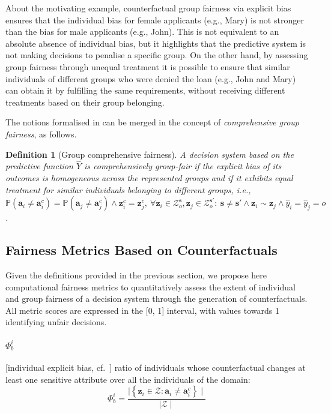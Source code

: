 \documentclass[letterpaper]{article} %
\newtheorem{definition}{Definition}
\begin{document}
About the motivating example, counterfactual group fairness via explicit bias ensures that the individual bias for female applicants (e.g., Mary) is not stronger than the bias for male applicants (e.g., John). This is not equivalent to an absolute absence of individual bias, but it highlights that the predictive system is not making decisions to penalise a specific group.
%
On the other hand, by assessing group fairness through unequal treatment it is possible to ensure that similar individuals of different groups who were denied the loan (e.g., John and Mary) can obtain it by fulfilling the same requirements, without receiving different treatments based on their group belonging.

The notions formalised in  can be merged in the concept of \emph{comprehensive group fairness}, as follows.
%
\begin{definition}[Group comprehensive fairness]\label{comprehensive_group}
	A decision system based on the predictive function $\hat{Y}$ is \emph{comprehensively group-fair} if the explicit bias of its outcomes is homogeneous across the represented groups and if it exhibits equal treatment for similar individuals belonging to different groups, i.e., $\mathbb{P}(\boldsymbol{a}_{i} \neq \boldsymbol{a}_{i}^{c}) = \mathbb{P}(\boldsymbol{a}_{j} \neq \boldsymbol{a}_{j}^{c}) \wedge \boldsymbol{z}_i^c = \boldsymbol{z}_j^c, ~ \forall \boldsymbol{z}_i \in \mathcal{Z}^{\boldsymbol{s}}_o, \boldsymbol{z}_j \in \mathcal{Z}^{\boldsymbol{s}'}_o : ~ \boldsymbol{s} \neq \boldsymbol{s}' \wedge \boldsymbol{z}_i \sim \boldsymbol{z}_j \wedge \hat{y}_i = \hat{y}_j = o$.
\end{definition}

\subsection{Fairness Metrics Based on Counterfactuals}

Given the definitions provided in the previous section, we propose here computational fairness metrics to quantitatively assess the extent of individual and group fairness of a decision system through the generation of counterfactuals.
%
All metric scores are expressed in the [0, 1] interval, with values towards 1 identifying unfair decisions.

\paragraph{$\Phi_b^i$} [individual explicit bias, cf.\ ] ratio of individuals whose counterfactual changes at least one sensitive attribute over all the individuals of the domain:
%
$$\Phi_b^i = \frac{ \mid \left\{ \boldsymbol{z}_i \in \mathcal{Z} : \boldsymbol{a}_{i} \neq \boldsymbol{a}_{i}^{c} \right\} \mid }{\mid \mathcal{Z} \mid} $$
\end{document}
